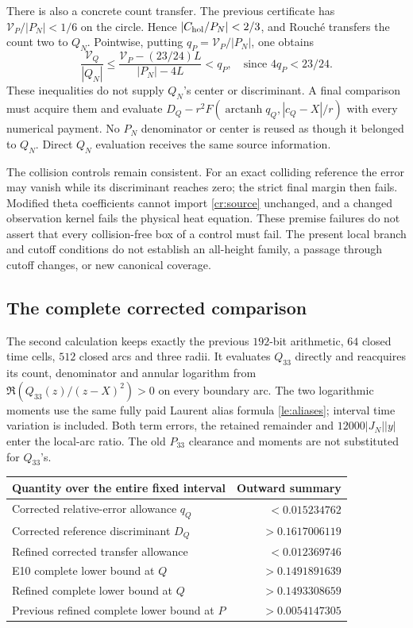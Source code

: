 There is also a concrete count transfer. The previous certificate has
$\mathcal V_P/|P_N|<1/6$ on the circle. Hence
$|C_{\rm hol}/P_N|<2/3$, and Rouch\'e transfers the count two to $Q_N$.
Pointwise, putting $q_P=\mathcal V_P/|P_N|$, one obtains
\begin{equation}
 \frac{\mathcal V_Q}{|Q_N|}
 \le\frac{\mathcal V_P-(23/24)L}{|P_N|-4L}<q_P,
 \quad\text{since }4q_P<23/24.
 \label{cr:relative}
\end{equation}
These inequalities do not supply $Q_N$'s center or discriminant. A final
comparison must acquire them and evaluate
$D_Q-r^2F(\operatorname{arctanh}q_Q,|c_Q-X|/r)$ with every numerical
payment. No $P_N$ denominator or center is reused as though it belonged
to $Q_N$. Direct $Q_N$ evaluation receives the same source information.

The collision controls remain consistent. For an exact colliding
reference the error may vanish while its discriminant reaches zero;
the strict final margin then fails. Modified theta coefficients cannot
import \eqref{cr:source} unchanged, and a changed observation kernel
fails the physical heat equation. These premise failures do not assert
that every collision-free box of a control must fail. The present local
branch and cutoff conditions do not establish an all-height family,
a passage through cutoff changes, or new canonical coverage.

\subsection{The complete corrected comparison}

The second calculation keeps exactly the previous $192$-bit arithmetic,
$64$ closed time cells, $512$ closed arcs and three radii. It evaluates
$Q_{33}$ directly and reacquires its count, denominator and annular
logarithm from $\Re(Q_{33}(z)/(z-X)^2)>0$ on every boundary arc.
The two logarithmic moments use the same fully paid Laurent alias formula
\eqref{le:aliases}; interval time variation is included. Both term errors,
the retained remainder and $12000|J_N||y|$ enter the local-arc ratio.
The old $P_{33}$ clearance and moments are not substituted for $Q_{33}$'s.

\begin{center}
\begin{tabular}{lr}
\toprule
Quantity over the entire fixed interval & Outward summary\\
\midrule
Corrected relative-error allowance $q_Q$ & $<0.015234762$\\
Corrected reference discriminant $D_Q$ & $>0.1617006119$\\
Refined corrected transfer allowance & $<0.012369746$\\
E10 complete lower bound at $Q$ & $>0.1491891639$\\
Refined complete lower bound at $Q$ & $>0.1493308659$\\
Previous refined complete lower bound at $P$ & $>0.0054147305$\\
\bottomrule
\end{tabular}
\end{center}

